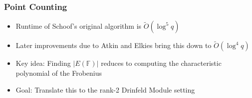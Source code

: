 \documentclass{beamer}
\newcommand{\ot}{\widetilde{O}}
\begin{document}
    
    









\begin{frame}
\frametitle{Point Counting}

\begin{itemize}
\item Runtime of Schoof's original algorithm is $\ot(\log^{5}q)$
\item Later improvements due to Atkin and Elkies bring this down to $\ot(\log^{4} q)$
\item Key idea: Finding $|E(\mathbb{F})|$ reduces to computing the characteristic polynomial of the Frobenius
\item Goal: Translate this to the rank-2 Drinfeld Module setting
\end{itemize}

\end{frame}


\end{document}
